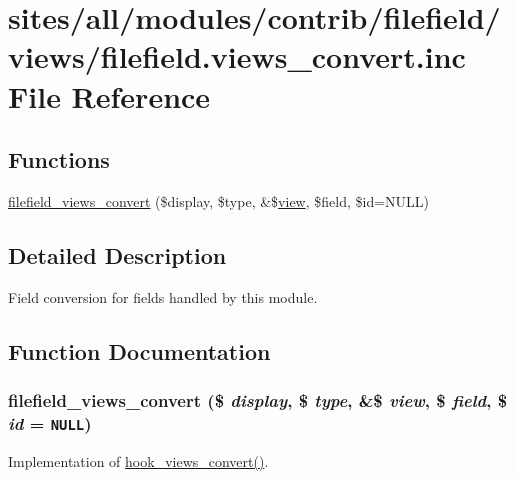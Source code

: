 \hypertarget{filefield_8views__convert_8inc}{
\section{sites/all/modules/contrib/filefield/views/filefield.views\_\-convert.inc File Reference}
\label{filefield_8views__convert_8inc}
}
\subsection*{Functions}
\begin{CompactItemize}
\item 
\hyperlink{filefield_8views__convert_8inc_9ed3fe97f30db130edc446faf724e60e}{filefield\_\-views\_\-convert} (\$display, \$type, \&\$\hyperlink{classview}{view}, \$field, \$id=NULL)
\end{CompactItemize}


\subsection{Detailed Description}
Field conversion for fields handled by this module. 

\subsection{Function Documentation}
\hypertarget{filefield_8views__convert_8inc_9ed3fe97f30db130edc446faf724e60e}{
\subsubsection[{filefield\_\-views\_\-convert}]{\setlength{\rightskip}{0pt plus 5cm}filefield\_\-views\_\-convert (\$ {\em display}, \/  \$ {\em type}, \/  \&\$ {\em view}, \/  \$ {\em field}, \/  \$ {\em id} = {\tt NULL})}}
\label{filefield_8views__convert_8inc_9ed3fe97f30db130edc446faf724e60e}


Implementation of \hyperlink{group__views__hooks_ge98b0a1c700fe1406af390dfc8c7262e}{hook\_\-views\_\-convert()}. 